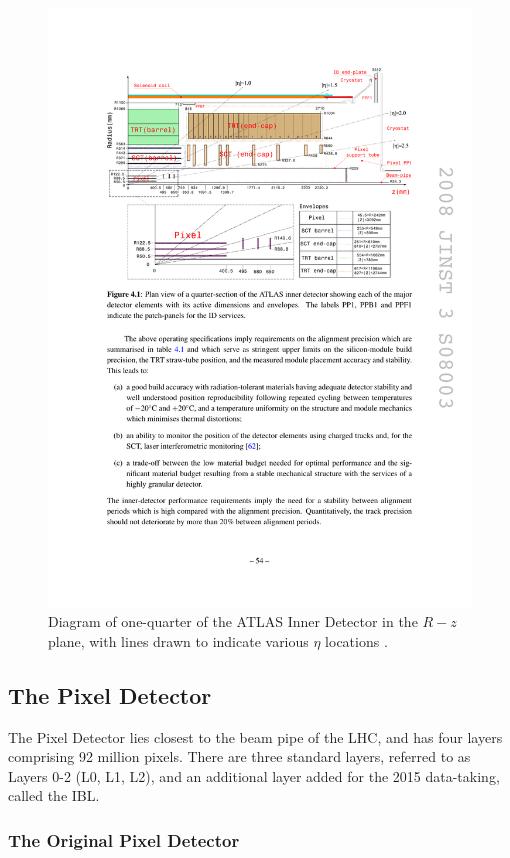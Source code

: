 \begin{centering}
\begin{figure}[!htb]
\myfloatalign
\includegraphics[width=.90\linewidth]{figures/atlas/ideta.pdf}
\caption{Diagram of one-quarter of the \ac{ATLAS} Inner Detector in the $R-z$ plane, with lines drawn to indicate various $\eta$ locations \cite{PERF-2007-01}.}
\label{fig:IDeta}
\end{figure}
\end{centering}

\subsection{The Pixel Detector}

The Pixel Detector lies closest to the beam pipe of the \ac{LHC}, and has four layers comprising 92 million pixels. There are three standard layers, referred to as Layers 0-2 (L0, L1, L2), and an additional layer added for the 2015 data-taking, called the \acf{IBL}. 

\subsubsection{The Original Pixel Detector}

